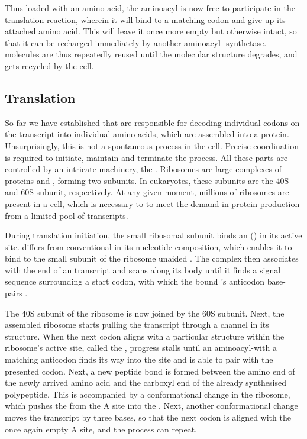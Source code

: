 Thus loaded with an amino acid, the aminoacyl-\trna is now free to participate
in the translation reaction, wherein it will bind to a matching codon and give
up its attached amino acid. This will leave it once more empty but otherwise
intact, so that it can be recharged immediately by another aminoacyl-\trna
synthetase. \trna molecules are thus repeatedly reused until the molecular
structure degrades, and gets recycled by the cell.

\subsection{Translation}

So far we have established that \trna[s] are responsible for decoding individual
codons on the \mrna transcript into individual amino acids, which are assembled
into a protein. Unsurprisingly, this is not a spontaneous process in the cell.
Precise coordination is required to initiate, maintain and terminate the
process. All these parts are controlled by an intricate machinery, the
. Ribosomes are large complexes of proteins and \rrna, forming
two subunits. In eukaryotes, these subunits are the 40S and 60S subunit,
respectively. At any given moment, millions of ribosomes are present in a cell,
which is necessary to to meet the demand in protein production from a limited
pool of \mrna transcripts.

During translation initiation, the small ribosomal subunit binds an
 () in its active site.
 differs from conventional  in its nucleotide
composition, which enables it to bind to the small subunit of the ribosome
unaided \citep{Kolitz:2010}. The complex then associates with the \fivep end of
an \mrna transcript and scans along its body until it finds a signal sequence
surrounding a start codon, with which the bound ’s anticodon
base-pairs \citep{Kozak:2002}.

The 40S subunit of the ribosome is now joined by the 60S subunit. Next, the
assembled ribosome starts pulling the \mrna transcript through a channel in its
structure. When the next codon aligns with a particular structure within the
ribosome’s active site, called the , progress stalls until an
aminoacyl-\trna with a matching anticodon finds its way into the site and is
able to pair with the presented codon. Next, a new peptide bond is formed
between the amino end of the newly arrived amino acid and the carboxyl end of
the already synthesised polypeptide. This is accompanied by a conformational
change in the ribosome, which pushes the \trna from the A site into the
. Next, another conformational change moves the \mrna transcript
by three bases, so that the next codon is aligned with the once again empty A
site, and the process can repeat.

